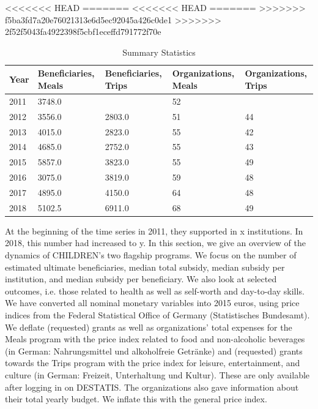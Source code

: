 \documentclass[12pt, a4paper, titlepage]{article}\usepackage[]{graphicx}\usepackage[]{color}
\begin{document}
<<<<<<< HEAD
=======
<<<<<<< HEAD
=======
>>>>>>> f5ba3fd7a20e76021313e6d5ec92045a426c0de1
>>>>>>> 2f52f5043fa4922398f5cbf1eceffd791772f70e
\begin{table}[ht]
\centering
\begin{tabular}{mmmmm}
  \hline
Year & Beneficiaries, Meals & Beneficiaries, Trips & Organizations, Meals & Organizations, Trips \\ 
  \hline
2011 & 3748.0 &  & 52 &  \\ 
  2012 & 3556.0 & 2803.0 & 51 & 44 \\ 
  2013 & 4015.0 & 2823.0 & 55 & 42 \\ 
  2014 & 4685.0 & 2752.0 & 55 & 43 \\ 
  2015 & 5857.0 & 3823.0 & 55 & 49 \\ 
  2016 & 3075.0 & 3819.0 & 59 & 48 \\ 
  2017 & 4895.0 & 4150.0 & 64 & 48 \\ 
  2018 & 5102.5 & 6911.0 & 68 & 49 \\ 
   \hline
\end{tabular}
\caption{Summary Statistics} 
\end{table}


At the beginning of the time series in 2011, they supported in x institutions. In 2018, this number had increased to y. In this section, we give an overview of the dynamics of CHILDREN's two flagship programs. We focus on the number of estimated ultimate beneficiaries, median total subsidy, median subsidy per institution, and median subsidy per beneficiary. We also look at selected outcomes, i.e. those related to health as well as self-worth and day-to-day skills. We have converted all nominal monetary variables into 2015 euros, using price indices from the Federal Statistical Office of Germany (Statistisches Bundesamt). We deflate (requested) grants as well as organizations' total expenses for the Meals program  with the price index related to food and non-alcoholic beverages (in German: Nahrungsmittel und alkoholfreie Getränke) and (requested) grants towards the Trips program with the price index for leisure, entertainment, and culture (in German: Freizeit, Unterhaltung und Kultur). These are only available after logging in on DESTATIS. The organizations also gave information about their total yearly budget. We inflate this with the general price index.    
\end{document}
